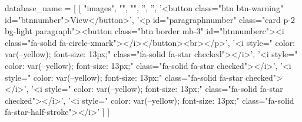 database_name = [
    [
        "images",
        "",
        "",
        '',
        '',
        '<button class="btn btn-warning" id="btnnumber">View</button>',
        '<p id="paragraphnumber" class="card p-2 bg-light paragraph"><button class="btn border mb-3" id="btnnumberc"><i class="fa-solid fa-circle-xmark"></i></button><br></p>',
        '<i style=" color: var(--yellow); font-size: 13px;" class="fa-solid fa-star checked"></i>',
        '<i style=" color: var(--yellow); font-size: 13px;" class="fa-solid fa-star checked"></i>',
        '<i style=" color: var(--yellow); font-size: 13px;" class="fa-solid fa-star checked"></i>',
        '<i style=" color: var(--yellow); font-size: 13px;" class="fa-solid fa-star checked"></i>',
        '<i style=" color: var(--yellow); font-size: 13px;" class="fa-solid fa-star-half-stroke"></i>'
    ]
]